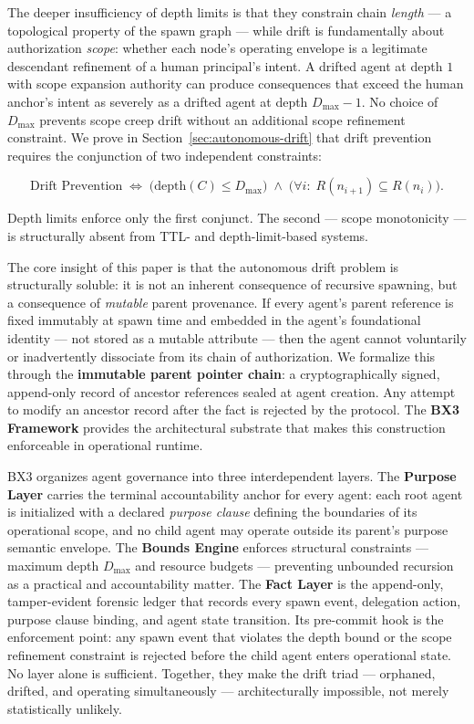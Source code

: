 The deeper insufficiency of depth limits is that they constrain chain \emph{length} — a topological property of the spawn graph — while drift is fundamentally about authorization \emph{scope}: whether each node's operating envelope is a legitimate descendant refinement of a human principal's intent. A drifted agent at depth $1$ with scope expansion authority can produce consequences that exceed the human anchor's intent as severely as a drifted agent at depth $D_{\max}-1$. No choice of $D_{\max}$ prevents scope creep drift without an additional scope refinement constraint. We prove in Section~\ref{sec:autonomous-drift} that drift prevention requires the conjunction of two independent constraints:

\begin{equation}
\text{Drift Prevention} \;\iff\; \bigl( \text{depth}(C) \leq D_{\max} \bigr) \;\land\; \bigl( \forall i:\; R(n_{i+1}) \subseteq R(n_i) \bigr).
\label{eq:intro-drift-prevention}
\end{equation}

Depth limits enforce only the first conjunct. The second — scope monotonicity — is structurally absent from TTL- and depth-limit-based systems.

The core insight of this paper is that the autonomous drift problem is structurally soluble: it is not an inherent consequence of recursive spawning, but a consequence of \emph{mutable} parent provenance. If every agent's parent reference is fixed immutably at spawn time and embedded in the agent's foundational identity — not stored as a mutable attribute — then the agent cannot voluntarily or inadvertently dissociate from its chain of authorization. We formalize this through the \textbf{immutable parent pointer chain}: a cryptographically signed, append-only record of ancestor references sealed at agent creation. Any attempt to modify an ancestor record after the fact is rejected by the protocol. The \textbf{BX3 Framework} provides the architectural substrate that makes this construction enforceable in operational runtime.

BX3 organizes agent governance into three interdependent layers. The \textbf{Purpose Layer} carries the terminal accountability anchor for every agent: each root agent is initialized with a declared \textit{purpose clause} defining the boundaries of its operational scope, and no child agent may operate outside its parent's purpose semantic envelope. The \textbf{Bounds Engine} enforces structural constraints — maximum depth $D_{\max}$ and resource budgets — preventing unbounded recursion as a practical and accountability matter. The \textbf{Fact Layer} is the append-only, tamper-evident forensic ledger that records every spawn event, delegation action, purpose clause binding, and agent state transition. Its pre-commit hook is the enforcement point: any spawn event that violates the depth bound or the scope refinement constraint is rejected before the child agent enters operational state. No layer alone is sufficient. Together, they make the drift triad — orphaned, drifted, and operating simultaneously — architecturally impossible, not merely statistically unlikely.

